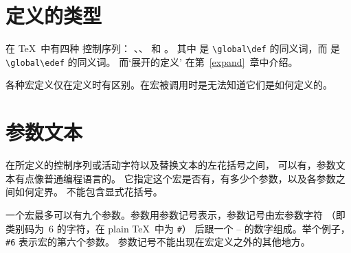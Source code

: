 \documentclass[letterpaper]{book}
\begin{document}
\section{定义的类型}

在 \TeX\ 中有四种  控制序列：
、、 和 。
其中
 是 \verb>\global\def> 的同义词，而
 是 \verb>\global\edef> 的同义词。
而`展开的定义'  在第~\ref{expand}~章中介绍。

各种宏定义仅在定义时有区别。在宏被调用时是无法知道它们是如何定义的。

\section{参数文本}
\label{param:text}

在所定义的控制序列或活动字符以及替换文本的左花括号之间，
可以有，参数文本有点像普通编程语言的。
它指定这个宏是否有，有多少个参数，以及各参数之间如何定界。
 不能包含显式花括号。

一个宏最多可以有九个参数。参数用参数记号表示，参数记号由宏参数字符%
（即类别码为~6 的字符，在 plain \TeX\ 中为 \verb=#=）%
后跟一个 -- 的数字组成。举个例子，\verb>#6> 表示宏的第六个参数。
参数记号不能出现在宏定义之外的其他地方。
\end{document}
